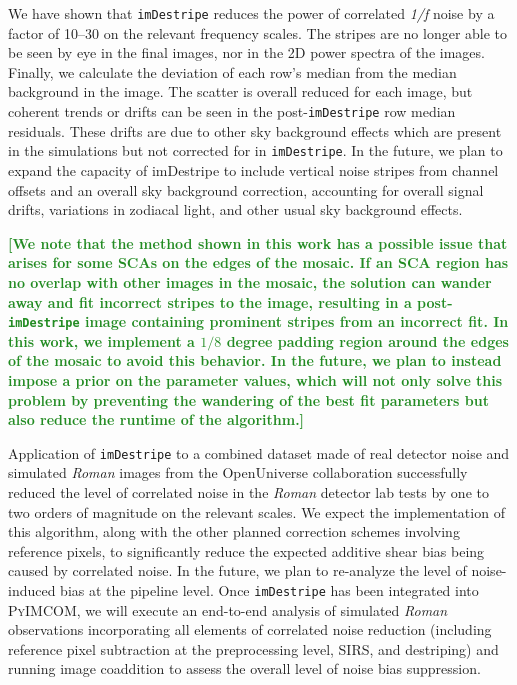 \documentclass[]{pasj01}
\newcommand{\Katherine}[1]{{\textcolor{ForestGreen}{\bfseries{[#1]}}}}
\newcommand{\Chris}[1]{{\textcolor{red}{\bfseries{[#1]}}}}
\begin{document}
We have shown that {\tt imDestripe} reduces the power of correlated \textit{1/f} noise by a factor of 10--30 on the relevant frequency scales. 
The stripes are no longer able to be seen by eye in the final images, nor in the 2D power spectra of the images. Finally, we calculate the deviation of each row's median from the median background in the image. The scatter is overall reduced for each image, but coherent trends or drifts can be seen in the post-\texttt{imDestripe} row median residuals. These drifts are due to other sky background effects which are present in the simulations but not corrected for in \texttt{imDestripe}. 
In the future, we plan to expand the capacity of imDestripe to include vertical noise stripes from channel offsets and an overall sky background correction, accounting for overall signal drifts, variations in zodiacal light, and other usual sky background effects.

\Katherine{We note that the method shown in this work has a possible issue that arises for some SCAs on the edges of the mosaic. If an SCA region has no overlap with other images in the mosaic, the solution can wander away and fit incorrect stripes to the image, resulting in a post-\texttt{imDestripe} image containing prominent stripes from an incorrect fit. In this work, we implement a $1/8$ degree padding region around the edges of the mosaic to avoid this behavior. In the future, we plan to instead impose a prior on the parameter values, which will not only solve this problem by preventing the wandering of the best fit parameters but also reduce the runtime of the algorithm.}

Application of \texttt{imDestripe} to a combined dataset made of real detector noise and simulated \textit{Roman} images from the OpenUniverse collaboration \cite{OpenUniverse2025}
successfully reduced the level of correlated noise in the \textit{Roman} detector lab tests by one to two orders of magnitude on the relevant scales. We expect the implementation of this algorithm, along with the other planned correction schemes involving reference pixels, to significantly reduce the expected additive shear bias being caused by correlated noise. In the future, we plan to re-analyze the level of noise-induced bias at the pipeline level. Once \texttt{imDestripe} has been integrated into \textsc{PyIMCOM}, we will execute an end-to-end analysis of simulated \textit{Roman} observations incorporating all elements of correlated noise reduction (including reference pixel subtraction at the preprocessing level, SIRS, and destriping) and running image coaddition to assess the overall level of noise bias suppression.
\end{document}
